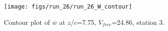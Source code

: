 \begin{figure}[H]
\centering
\texttt{[image: figs/run\_26/run\_26\_W\_contour]}
\caption{Contour plot of $\overline{w}$ at $z/c$=7.75, $V_{free}$=24.86, station 3.}
\label{fig:run_26_W_contour}
\end{figure}


